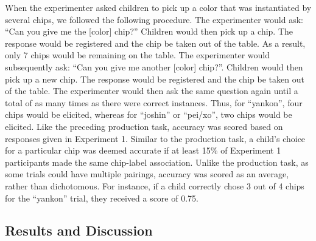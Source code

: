 \documentclass[,man,floatsintext]{apa6}
\theoremstyle{definition}
\theoremstyle{definition}
\theoremstyle{definition}
\theoremstyle{remark}
\begin{document}
When the experimenter asked children to pick up a color that was
instantiated by several chips, we followed the following procedure. The
experimenter would ask: \enquote{Can you give me the {[}color{]} chip?}
Children would then pick up a chip. The response would be registered and
the chip be taken out of the table. As a result, only 7 chips would be
remaining on the table. The experimenter would subsequently ask:
\enquote{Can you give me another {[}color{]} chip?}. Children would then
pick up a new chip. The response would be registered and the chip be
taken out of the table. The experimenter would then ask the same
question again until a total of as many times as there were correct
instances. Thus, for \enquote{yankon}, four chips would be elicited,
whereas for \enquote{joshin} or \enquote{pei/xo}, two chips would be
elicited. Like the preceding production task, accuracy was scored based
on responses given in Experiment 1. Similar to the production task, a
child's choice for a particular chip was deemed accurate if at least
15\% of Experiment 1 participants made the same chip-label association.
Unlike the production task, as some trials could have multiple pairings,
accuracy was scored as an average, rather than dichotomous. For
instance, if a child correctly chose 3 out of 4 chips for the
\enquote{yankon} trial, they received a score of 0.75.

\subsection{Results and Discussion}\label{results-and-discussion-1}
\end{document}
